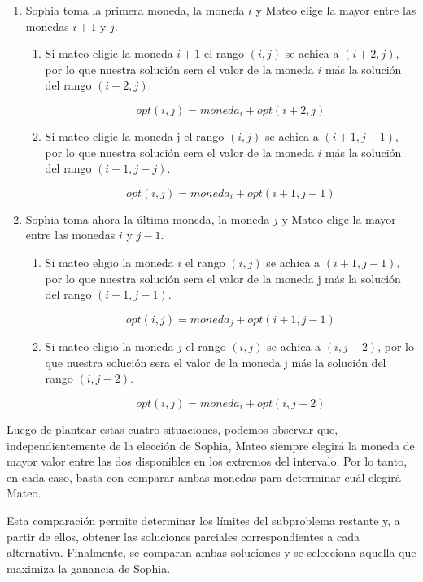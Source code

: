 \begin{enumerate}
    \item Sophia toma la primera moneda, la moneda $i$ y Mateo elige la mayor entre las monedas $i + 1$ y $j$.

    \begin{enumerate}
        \item Si mateo eligie la moneda $i + 1$ el rango $(i, j)$ se achica a $(i + 2, j)$, por lo que nuestra solución sera el valor de la moneda $i$ más la solución del rango $(i + 2, j)$.

        $$opt(i, j) = moneda_i + opt(i + 2, j)$$

        \item Si mateo eligie la moneda j el rango $(i, j)$ se achica a $(i + 1, j - 1)$, por lo que nuestra solución sera el valor de la moneda $i$ más la solución del rango $(i + 1, j - j)$.

        $$opt(i, j) = moneda_i + opt(i + 1, j - 1)$$

    \end{enumerate}

    \item Sophia toma ahora la última moneda, la moneda $j$ y Mateo elige la mayor entre las monedas $i$ y $j - 1$.

    \begin{enumerate}
        \item Si mateo eligio la moneda $i$ el rango $(i, j)$ se achica a $(i + 1, j - 1)$, por lo que nuestra solución sera el valor de la moneda j más la solución del rango $(i + 1, j - 1)$.

        $$opt(i, j) = moneda_j + opt(i + 1, j - 1)$$

        \item Si mateo eligio la moneda $j$ el rango $(i, j)$ se achica a $(i, j - 2)$, por lo que nuestra solución sera el valor de la moneda j más la solución del rango $(i, j - 2)$.

        $$opt(i, j) = moneda_i + opt(i, j - 2)$$
    \end{enumerate}
\end{enumerate}

Luego de plantear estas cuatro situaciones, podemos observar que, independientemente de la elección de Sophia, Mateo siempre elegirá la moneda de mayor valor entre las dos disponibles en los extremos del intervalo. Por lo tanto, en cada caso, basta con comparar ambas monedas para determinar cuál elegirá Mateo.


Esta comparación permite determinar los límites del subproblema restante y, a partir de ellos, obtener las soluciones parciales correspondientes a cada alternativa. Finalmente, se comparan ambas soluciones y se selecciona aquella que maximiza la ganancia de Sophia.

